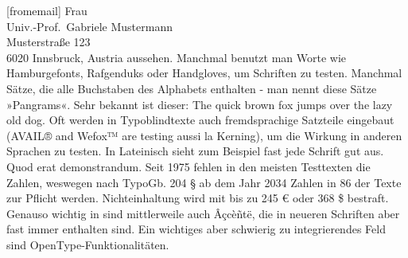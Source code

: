 \documentclass[ngerman,noconfig]{uibklttr}
\begin{document}
\begin{letter}[fromemail]{%
  Frau\\
  Univ.-Prof.~Gabriele Mustermann\\
  Musterstraße 123\\
  6020 Innsbruck, Austria}
aussehen. Manchmal benutzt man Worte wie Hamburgefonts, Rafgenduks oder
Handgloves, um Schriften zu testen. Manchmal Sätze, die alle Buchstaben des
Alphabets enthalten - man nennt diese Sätze »Pangrams«. Sehr bekannt ist dieser:
The quick brown fox jumps over the lazy old dog. Oft werden in Typoblindtexte
auch fremdsprachige Satzteile eingebaut (AVAIL® and Wefox™ are testing aussi la
Kerning), um die Wirkung in anderen Sprachen zu testen. In Lateinisch sieht zum
Beispiel fast jede Schrift gut aus. Quod erat demonstrandum. Seit 1975 fehlen in
den meisten Testtexten die Zahlen, weswegen nach TypoGb. 204 § ab dem Jahr 2034
Zahlen in 86 der Texte zur Pflicht werden. Nichteinhaltung wird mit bis zu 245 €
oder 368 \$ bestraft.  Genauso wichtig in sind mittlerweile auch Âçcèñtë, die in
neueren Schriften aber fast immer enthalten sind. Ein wichtiges aber schwierig
zu integrierendes Feld sind OpenType-Funktionalitäten.
\end{letter}
\end{document}
